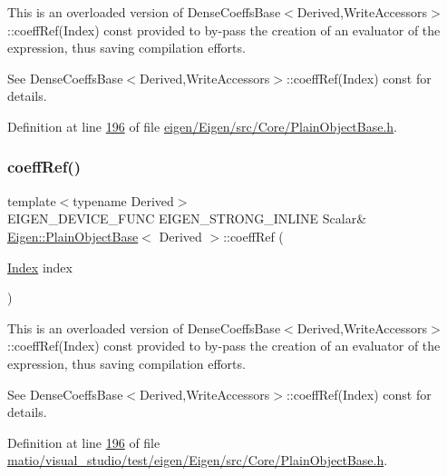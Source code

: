 This is an overloaded version of Dense\+Coeffs\+Base$<$\+Derived,\+Write\+Accessors$>$\+::coeff\+Ref(\+Index) const provided to by-\/pass the creation of an evaluator of the expression, thus saving compilation efforts.

See Dense\+Coeffs\+Base$<$\+Derived,\+Write\+Accessors$>$\+::coeff\+Ref(\+Index) const for details. 

Definition at line \hyperlink{eigen_2_eigen_2src_2_core_2_plain_object_base_8h_source_l00196}{196} of file \hyperlink{eigen_2_eigen_2src_2_core_2_plain_object_base_8h_source}{eigen/\+Eigen/src/\+Core/\+Plain\+Object\+Base.\+h}.

\mbox{\label{class_eigen_1_1_plain_object_base_a571632ed666076d7403c8bd3eece44f0}} 
\subsubsection{\texorpdfstring{coeff\+Ref()}{coeffRef()}\hspace{0.1cm}{\footnotesize\ttfamily [4/8]}}
{\footnotesize\ttfamily template$<$typename Derived$>$ \\
E\+I\+G\+E\+N\+\_\+\+D\+E\+V\+I\+C\+E\+\_\+\+F\+U\+NC E\+I\+G\+E\+N\+\_\+\+S\+T\+R\+O\+N\+G\+\_\+\+I\+N\+L\+I\+NE Scalar\& \hyperlink{class_eigen_1_1_plain_object_base}{Eigen\+::\+Plain\+Object\+Base}$<$ Derived $>$\+::coeff\+Ref (\begin{DoxyParamCaption}\item[{\hyperlink{namespace_eigen_a62e77e0933482dafde8fe197d9a2cfde}{Index}}]{index }\end{DoxyParamCaption})\hspace{0.3cm}{\ttfamily [inline]}}

This is an overloaded version of Dense\+Coeffs\+Base$<$\+Derived,\+Write\+Accessors$>$\+::coeff\+Ref(\+Index) const provided to by-\/pass the creation of an evaluator of the expression, thus saving compilation efforts.

See Dense\+Coeffs\+Base$<$\+Derived,\+Write\+Accessors$>$\+::coeff\+Ref(\+Index) const for details. 

Definition at line \hyperlink{matio_2visual__studio_2test_2eigen_2_eigen_2src_2_core_2_plain_object_base_8h_source_l00196}{196} of file \hyperlink{matio_2visual__studio_2test_2eigen_2_eigen_2src_2_core_2_plain_object_base_8h_source}{matio/visual\+\_\+studio/test/eigen/\+Eigen/src/\+Core/\+Plain\+Object\+Base.\+h}.

